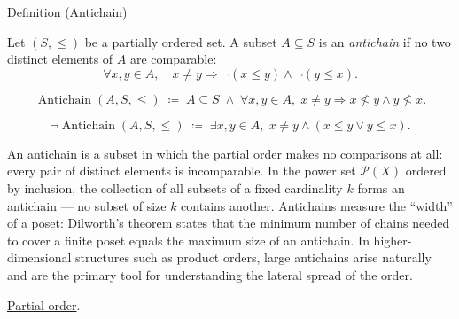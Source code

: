 \begin{definitionbox}{Definition (Antichain)}
\begin{definition}[Antichain]
\label{def:antichain}
Let $(S, \leq)$ be a partially ordered set.  A subset $A \subseteq S$ is
an \emph{antichain} if no two distinct elements of $A$ are comparable:
\[
\forall x, y \in A, \quad x \neq y \Longrightarrow \neg(x \leq y) \land \neg(y \leq x).
\]
\end{definition}
\end{definitionbox}

\begin{remark*}
\[
\operatorname{Antichain}(A, S, \leq)
\;\coloneqq\;
A \subseteq S
\;\land\;
\forall x, y \in A,\; x \neq y \Rightarrow x \not\leq y \land y \not\leq x.
\]
\end{remark*}

\begin{remark*}
\[
\neg\operatorname{Antichain}(A, S, \leq)
\;\coloneqq\;
\exists x, y \in A,\; x \neq y \land (x \leq y \lor y \leq x).
\]
\end{remark*}

\begin{remark*}[Interpretation]
An antichain is a subset in which the partial order makes no comparisons at
all: every pair of distinct elements is incomparable.  In the power set
$\mathcal{P}(X)$ ordered by inclusion, the collection of all subsets of
a fixed cardinality $k$ forms an antichain — no subset of size $k$ contains
another.  Antichains measure the ``width'' of a poset: Dilworth's theorem
states that the minimum number of chains needed to cover a finite poset
equals the maximum size of an antichain.  In higher-dimensional structures
such as product orders, large antichains arise naturally and are the primary
tool for understanding the lateral spread of the order.
\end{remark*}

\begin{remark*}[Dependencies]
\hyperref[def:partial-order]{Partial order}.
\end{remark*}
